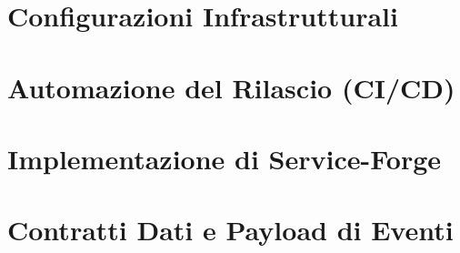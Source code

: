 %
%

\begin{appendices}
    \chapter{Configurazioni Infrastrutturali}
    
    \chapter{Automazione del Rilascio (CI/CD)}
    
    \chapter{Implementazione di Service-Forge}
    
    \chapter{Contratti Dati e Payload di Eventi}
    
\end{appendices}


